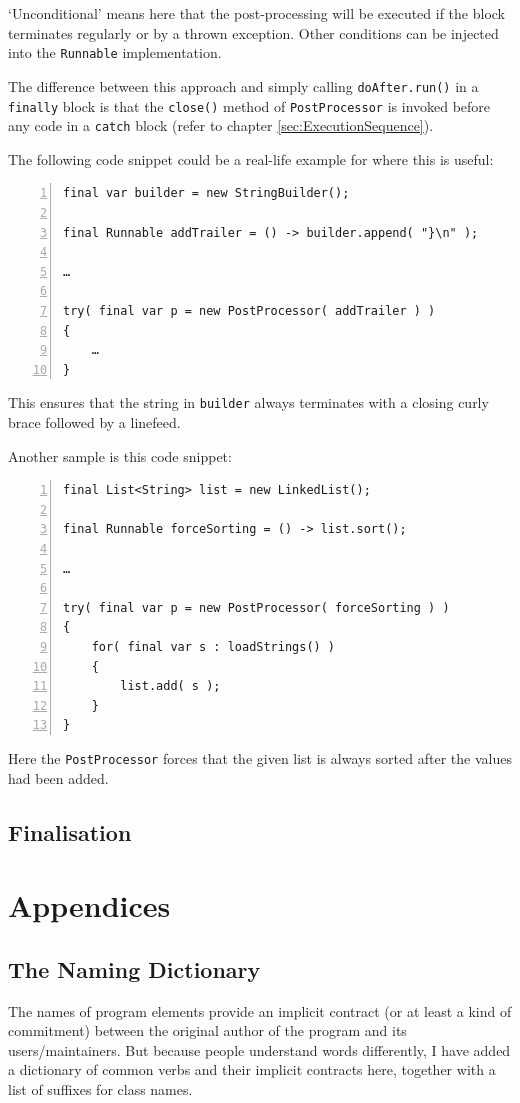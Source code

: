 \documentclass[12pt,a4paper,titlepage, parskip=half, headsepline, footsepline, cleardoubleplain]{scrbook}
\begin{document}
‘Unconditional’ means here that the post-processing will be executed if the block terminates regularly or by a thrown exception. Other conditions can be injected into the \lstinline|Runnable| implementation.

The difference between this approach and simply calling \lstinline|doAfter.run()| in a \lstinline|finally| block is that the \lstinline|close()| method of \lstinline|PostProcessor| is invoked before any code in a \lstinline|catch| block (refer to chapter \ref{sec:ExecutionSequence}).

The following code snippet could be a real-life example for where this is useful:
\begin{lstlisting}[numbers=left]
final var builder = new StringBuilder();

final Runnable addTrailer = () -> builder.append( "}\n" );

…

try( final var p = new PostProcessor( addTrailer ) )
{
    …
}
\end{lstlisting}
This ensures that the string in \lstinline|builder| always terminates with a closing curly brace followed by a linefeed.

Another sample is this code snippet:
\begin{lstlisting}[numbers=left]
final List<String> list = new LinkedList();

final Runnable forceSorting = () -> list.sort();

…

try( final var p = new PostProcessor( forceSorting ) )
{
    for( final var s : loadStrings() )
    {
        list.add( s );
    }
}
\end{lstlisting}
Here the \lstinline|PostProcessor| forces that the given list is always sorted after the values had been added.

\section{Finalisation}

\chapter{Appendices}

\section{The Naming Dictionary}\label{sec:TheNamingDictionary}
The names of program elements provide an implicit contract (or at least a kind of commitment) between the original author of the program and its users/maintainers. But because people understand words differently, I have added a dictionary of common verbs and their implicit contracts here, together with a list of suffixes for class names.
\end{document}
